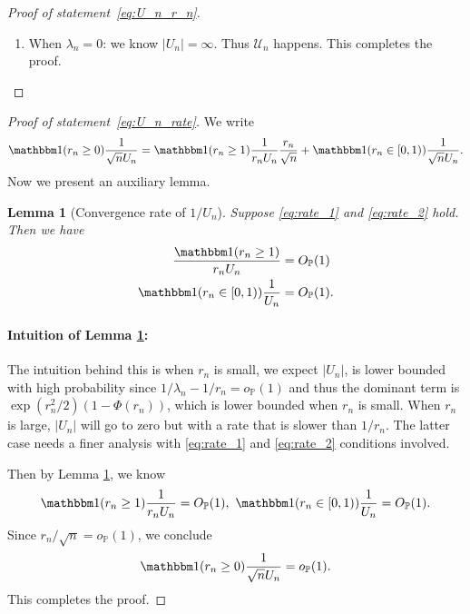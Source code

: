 \documentclass[12pt]{article}
\newtheorem{lemma}{Lemma}
\theoremstyle{definition}
\def\P{\mathbb{P}}
\def\P{\mathbb{P}}
\renewcommand{\P}{\mathbb{P}}							%
\newcommand{\indicator}{\mathbbm 1}						%
\begin{document}
\begin{proof}[Proof of statement~\eqref{eq:U_n_r_n}]
\begin{enumerate}
		\item 
		When $\lambda_n=0$: we know $|U_n|=\infty$. Thus $\mathcal{U}_n$ happens. This completes the proof.
	\end{enumerate}
\end{proof}

\begin{proof}[Proof of statement~\eqref{eq:U_n_rate}]
	We write
	\begin{align*}
		\indicator(r_n\geq 0)\frac{1}{\sqrt{n}U_n}=\indicator(r_n \geq 1)\frac{1}{r_nU_n}\frac{r_n}{\sqrt{n}}+\indicator(r_n\in [0,1))\frac{1}{\sqrt{n}U_n}.
	\end{align*}
	Now we present an auxiliary lemma.
	\begin{lemma}[Convergence rate of $1/U_n$]\label{lem:convergence_rate_denominator_relative_error}
		Suppose \eqref{eq:rate_1} and \eqref{eq:rate_2} hold. Then we have 
		\begin{align}
			\frac{\indicator(r_n\geq 1)}{r_nU_n}
			&\label{eq:relative_error_denominator_1}
			=O_{\P}(1)\\
			\indicator(r_n\in [0,1))\frac{1}{U_n}
			&
			\label{eq:relative_error_denominator_2}
			=O_{\P}(1).
		\end{align}
	\end{lemma}
	\paragraph{Intuition of Lemma \ref{lem:convergence_rate_denominator_relative_error}:}
	The intuition behind this is when $r_n$ is small, we expect $|U_n|$, is lower bounded with high probability since $1/\lambda_n-1/r_n=o_{\P}(1)$ and thus the dominant term is $\exp(r_n^2/2)(1-\Phi(r_n))$, which is lower bounded when $r_n$ is small. When $r_n$ is large, $|U_n|$ will go to zero but with a rate that is slower than $1/r_n$. The latter case needs a finer analysis with \eqref{eq:rate_1} and \eqref{eq:rate_2} conditions involved. 
	
	Then by Lemma \ref{lem:convergence_rate_denominator_relative_error}, we know 
	\begin{align*}
		\indicator(r_n\geq 1)\frac{1}{r_nU_n}=O_{\P}(1),\ \indicator(r_n\in [0,1))\frac{1}{U_n}=O_{\P}(1).
	\end{align*}
	Since $r_n/\sqrt{n}=o_{\P}(1)$, we conclude 
	\begin{align*}
		\indicator(r_n\geq 0)\frac{1}{\sqrt{n}U_n}=o_{\P}(1).
	\end{align*}
	This completes the proof.
  \end{proof}
\end{document}
